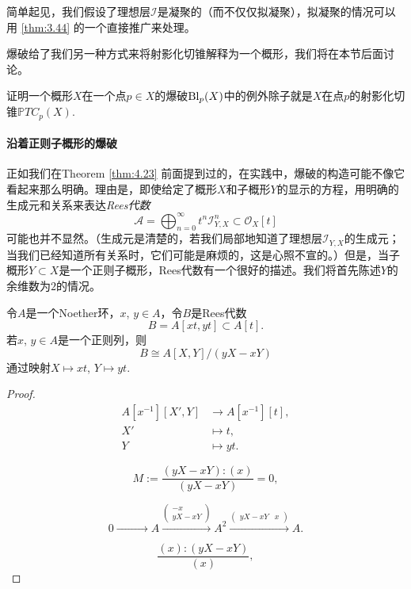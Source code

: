 简单起见，我们假设了理想层$\mathscr I$是凝聚的（而不仅仅拟凝聚），拟凝聚的情况可以用 \ref{thm:3.44} 的一个直接推广来处理。

爆破给了我们另一种方式来将射影化切锥解释为一个概形，我们将在本节后面讨论。

\begin{exe}\label{exe:4.24}
	证明一个概形$X$在一个点$p\in X$的爆破$\operatorname{Bl}_p(X)$中的例外除子就是$X$在点$p$的射影化切锥$\mathbb PTC_p(X)$.
\end{exe}

\paragraph*{沿着正则子概形的爆破} 正如我们在Theorem \ref{thm:4.23} 前面提到过的，在实践中，爆破的构造可能不像它看起来那么明确。理由是，即使给定了概形$X$和子概形$Y$的显示的方程，用明确的生成元和关系来表达\textit{Rees代数}
\[
	\mathscr A=\bigoplus_{n=0}^\infty t^n\mathscr I_{Y,X}^n\subset \mathscr O_X[t]
\]
可能也并不显然。（生成元是清楚的，若我们局部地知道了理想层$\mathscr I_{Y,X}$的生成元；当我们已经知道所有关系时，它们可能是麻烦的，这是心照不宣的。）但是，当子概形$Y\subset X$是一个正则子概形，Rees代数有一个很好的描述。我们将首先陈述$Y$的余维数为$2$的情况。


\begin{pro}\label{pro:4.25}
令$A$是一个Noether环，$x$, $y\in A$，令$B$是Rees代数
	\[
		B=A[xt,yt]\subset A[t].
	\]
若$x$, $y\in A$是一个正则列，则
	\[
		B\cong A[X,Y]/(yX-xY)
	\]
通过映射$X\mapsto xt$, $Y\mapsto yt$.
\end{pro}

\begin{proof}

	\[
		\begin{aligned}
			A[x^{-1}][X',Y] & \longrightarrow A[x^{-1}][t],\\
			X' &\longmapsto t,\\
			Y  &\longmapsto yt.
		\end{aligned}
	\]
	
	\[
		M:=\frac{(yX-xY):(x)}{(yX-xY)}=0,
	\]
	
	\[
		0\xrightarrow{\qquad\quad\quad} A \xrightarrow{
		\begin{pmatrix}
			-x\\ yX-xY
		\end{pmatrix}}A^2
		\xrightarrow{\begin{pmatrix}
			yX-xY& x
		\end{pmatrix}}A.
	\]
	
	\[
		\frac{(x):(yX-xY)}{(x)},
	\]	

\end{proof}

